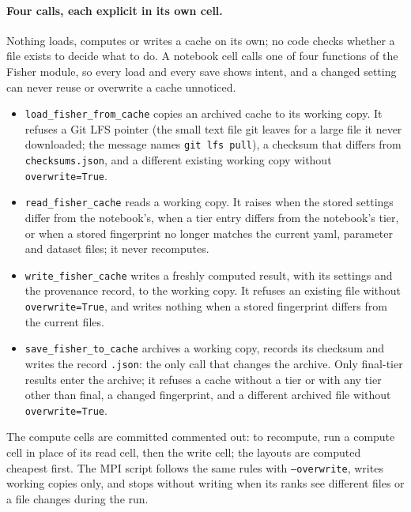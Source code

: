 \documentclass[11pt]{article}
\newcommand{\us}{\_\allowbreak}
\begin{document}
\paragraph{Four calls, each explicit in its own cell.}
Nothing loads, computes or writes a cache on its own; no code checks
whether a file exists to decide what to do.  A notebook cell calls one
of four functions of the Fisher module, so every load and every save
shows intent, and a changed setting can never reuse or overwrite a
cache unnoticed.
\begin{itemize}
  \item \texttt{load\us fisher\us from\us cache} copies an archived
    cache to its working copy.  It refuses a Git LFS pointer (the
    small text file git leaves for a large file it never downloaded;
    the message names \texttt{git lfs pull}), a checksum that differs
    from \texttt{checksums.json}, and a different existing working
    copy without \texttt{overwrite=True}.
  \item \texttt{read\us fisher\us cache} reads a working copy.  It
    raises when the stored settings differ from the notebook's, when a
    tier entry differs from the notebook's tier, or when a stored
    fingerprint no longer matches the current yaml, parameter and
    dataset files; it never recomputes.
  \item \texttt{write\us fisher\us cache} writes a freshly computed
    result, with its settings and the provenance record, to the
    working copy.  It refuses an existing file without
    \texttt{overwrite=True}, and writes nothing when a stored
    fingerprint differs from the current files.
  \item \texttt{save\us fisher\us to\us cache} archives a working
    copy, records its checksum and writes the record
    \texttt{.json}: the only call that changes the archive.  Only
    final-tier results enter the archive; it refuses a cache without a
    tier or with any tier other than final, a changed fingerprint, and
    a different archived file without \texttt{overwrite=True}.
\end{itemize}
The compute cells are committed commented out: to recompute, run a
compute cell in place of its read cell, then the write cell; the
layouts are computed cheapest first.  The MPI script follows the same
rules with \texttt{--overwrite}, writes working copies only, and
stops without writing when its ranks see different files or a file
changes during the run.
\end{document}
